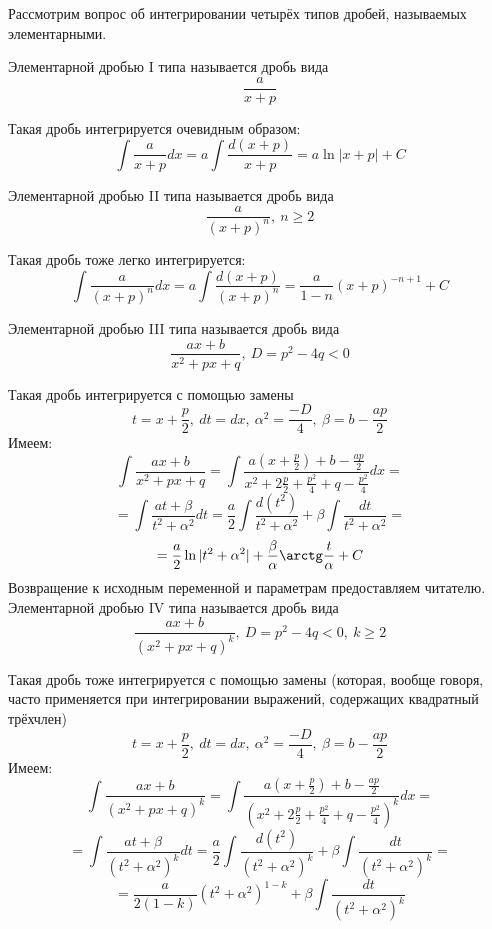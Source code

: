 Рассмотрим вопрос об интегрировании четырёх типов дробей, называемых элементарными.

\opred
Элементарной дробью I типа называется дробь вида
\begin{equation}\label{elem_drob_I}
\frac{a}{x+p}
\end{equation}

Такая дробь интегрируется очевидным образом:
$$
\int\frac{a}{x+p}dx=a\int\frac{d(x+p)}{x+p}=a\ln|x+p|+C
$$

\opred
Элементарной дробью II типа называется дробь вида
\begin{equation}\label{elem_drob_II}
\frac{a}{(x+p)^n},~n\geq 2
\end{equation}

Такая дробь тоже легко интегрируется:
$$
\int\frac{a}{(x+p)^n}dx=a\int\frac{d(x+p)}{(x+p)^n}=\frac{a}{1-n}(x+p)^{-n+1}+C
$$

\opred
Элементарной дробью III типа называется дробь вида
\begin{equation}\label{elem_drob_III}
\frac{ax+b}{x^2+px+q},~ D=p^2-4q<0
\end{equation}

Такая дробь интегрируется с помощью замены
\begin{equation}
t=x+\frac{p}{2},~ dt=dx, ~ \alpha^2=\frac{-D}{4}, ~\beta=b-\frac{ap}{2}
\end{equation}
Имеем:
$$
\int \frac{ax+b}{x^2+px+q}=\int\frac{a\left(x+\frac{p}{2}\right)+b-\frac{ap}{2}}{x^2+2\frac{p}{2}+\frac{p^2}{4}+q-\frac{p^2}{4}}dx=$$$$=
\int\frac{at+\beta}{t^2+\alpha^2}dt=\frac{a}{2}\int\frac{d(t^2)}{t^2+\alpha^2}+\beta\int\frac{dt}{t^2+\alpha^2}=$$$$=\frac{a}{2}\ln|t^2+\alpha^2|+\frac{\beta}{\alpha}\arctg\frac{t}{\alpha}+C
$$
Возвращение к исходным переменной и параметрам предоставляем читателю.
\opred
Элементарной дробью IV типа называется дробь вида
\begin{equation}\label{elem_drob_III}
\frac{ax+b}{(x^2+px+q)^k},~ D=p^2-4q<0,~k\geq 2
\end{equation}

Такая дробь тоже интегрируется с помощью замены (которая, вообще говоря, часто применяется при интегрировании выражений, содержащих квадратный трёхчлен)
\begin{equation}
t=x+\frac{p}{2},~ dt=dx, ~ \alpha^2=\frac{-D}{4}, ~\beta=b-\frac{ap}{2}
\end{equation}
Имеем:
$$
\int \frac{ax+b}{(x^2+px+q)^k}=
\int
	\frac	{a\left(x+\frac{p}{2}\right)+b-\frac{ap}{2}}
		{\left(x^2+2\frac{p}{2}+\frac{p^2}{4}+q-\frac{p^2}{4}\right)^k}
dx=
$$$$=
\int\frac{at+\beta}{(t^2+\alpha^2)^k}dt=
\frac{a}{2}\int\frac{d(t^2)}{(t^2+\alpha^2)^k}+\beta\int\frac{dt}{(t^2+\alpha^2)^k}=
$$$$=
\frac{a}{2(1-k)}(t^2+\alpha^2)^{1-k}+\beta\int\frac{dt}{(t^2+\alpha^2)^k}
$$

